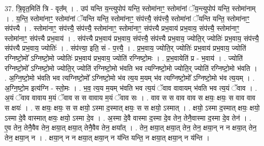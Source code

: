 \documentclass[17pt]{extarticle}
\begin{document}
37. त्रि॒वृत॒मिति॑ त्रि - वृत᳚म् । . उप॑ यन्ति य॒न्त्युपोप॑ यन्ति॒ स्तोमा॑नाꣳ॒॒ स्तोमा॑नां ॅय॒न्त्युपोप॑ यन्ति॒ स्तोमा॑नाम् । . य॒न्ति॒ स्तोमा॑नाꣳ॒॒ स्तोमा॑नां ॅयन्ति यन्ति॒ स्तोमा॑नाꣳ॒॒ संप॑त्त्यै॒ संप॑त्त्यै॒ स्तोमा॑नां ॅयन्ति यन्ति॒ स्तोमा॑नाꣳ॒॒ संप॑त्त्यै । . स्तोमा॑नाꣳ॒॒ संप॑त्त्यै॒ संप॑त्त्यै॒ स्तोमा॑नाꣳ॒॒ स्तोमा॑नाꣳ॒॒ संप॑त्त्यै प्रभ॒वाय॑ प्रभ॒वाय॒ संप॑त्त्यै॒ स्तोमा॑नाꣳ॒॒ स्तोमा॑नाꣳ॒॒ संप॑त्त्यै प्रभ॒वाय॑ । . संप॑त्त्यै प्रभ॒वाय॑ प्रभ॒वाय॒ संप॑त्त्यै॒ संप॑त्त्यै प्रभ॒वाय॒ ज्योति॒र् ज्योतिः॑ प्रभ॒वाय॒ संप॑त्त्यै॒ संप॑त्त्यै प्रभ॒वाय॒ ज्योतिः॑ । . संप॑त्त्या॒ इति॒ सं - प॒त्त्यै॒ । . प्र॒भ॒वाय॒ ज्योति॒र् ज्योतिः॑ प्रभ॒वाय॑ प्रभ॒वाय॒ ज्योति॑ रग्निष्टो॒मो᳚ ऽग्निष्टो॒मो ज्योतिः॑ प्रभ॒वाय॑ प्रभ॒वाय॒ ज्योति॑ रग्निष्टो॒मः । . प्र॒भ॒वायेति॑ प्र - भ॒वाय॑ । . ज्योति॑ रग्निष्टो॒मो᳚ ऽग्निष्टो॒मो ज्योति॒र् ज्योति॑ रग्निष्टो॒मो भ॑वति भव त्यग्निष्टो॒मो ज्योति॒र् ज्योति॑ रग्निष्टो॒मो भ॑वति । . अ॒ग्नि॒ष्टो॒मो भ॑वति भव त्यग्निष्टो॒मो᳚ ऽग्निष्टो॒मो भ॑व त्य॒य म॒यम् भ॑व त्यग्निष्टो॒मो᳚ ऽग्निष्टो॒मो भ॑व त्य॒यम् । . अ॒ग्नि॒ष्टो॒म इत्य॑ग्नि - स्तो॒मः । . भ॒व॒ त्य॒य म॒यम् भ॑वति भव त्य॒यं ॅवाव वावायम् भ॑वति भव त्य॒यं ॅवाव । . अ॒यं ॅवाव वावाय म॒यं ॅवाव स स वावाय म॒यं ॅवाव सः । . वाव स स वाव वाव स क्षयः॒ क्षयः॒ स वाव वाव स क्षयः॑ । . स क्षयः॒ क्षयः॒ स स क्षयो॒ ऽस्मा द॒स्मात् क्षयः॒ स स क्षयो॒ ऽस्मात् । . क्षयो॒ ऽस्मा द॒स्मात् क्षयः॒ क्षयो॒ ऽस्मा दे॒वै वास्मात् क्षयः॒ क्षयो॒ ऽस्मा दे॒व । . अ॒स्मा दे॒वै वास्मा द॒स्मा दे॒व तेन॒ तेनै॒वास्मा द॒स्मा दे॒व तेन॑ । . ए॒व तेन॒ तेनै॒वैव तेन॒ क्षया॒त् क्षया॒त् तेनै॒वैव तेन॒ क्षया᳚त् । . तेन॒ क्षया॒त् क्षया॒त् तेन॒ तेन॒ क्षया॒न् न न क्षया॒त् तेन॒ तेन॒ क्षया॒न् न । . क्षया॒न् न न क्षया॒त् क्षया॒न् न य॑न्ति यन्ति॒ न क्षया॒त् क्षया॒न् न य॑न्ति । \newline
\end{document}
